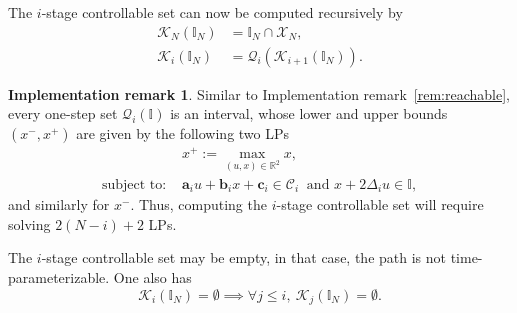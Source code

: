 \documentclass[journal]{IEEEtran}
\theoremstyle{plain}
\theoremstyle{definition}
\theoremstyle{definition}
\newtheorem{remark2}{Implementation remark}
\newenvironment{remark}
  {\renewcommand{\qedsymbol}{$\lozenge$}%
   \pushQED{\qed}\begin{remark2}}
  {\popQED\end{remark2}}
\newcommand{\cC}{\mathscr{C}}
\newcommand{\calX}{\mathcal{X}}
\newcommand{\calK}{\mathcal{K}}
\newcommand{\bbI}{\mathbb{I}}
\newcommand{\calQ}{\mathcal{Q}}
\begin{document}
The $i$-stage controllable set can now be computed recursively by
\begin{equation}
  \label{eq:ctrl-comp}
  \begin{aligned}
    \calK_N(\bbI_N) &= \bbI_N \cap \calX_N,\\
    \calK_i(\bbI_N) &= \calQ_i(\calK_{i+1}(\bbI_N)).
  \end{aligned}
\end{equation}

\begin{remark}
\label{rem:controllable}
Similar to Implementation remark~\ref{rem:reachable},
every one-step set $\calQ_i(\bbI)$ is an interval, whose lower and
upper bounds $(x^-,x^+)$ are given by the following two LPs
\[
  \begin{aligned}
&x^+ := \max_{(u,x)\in\mathbb R^2} x, \\
\textrm{subject to:~} &\mathbf{a}_i u + \mathbf{b}_i x+ \mathbf{c}_i
\in \cC_i \ \textrm{~and~}  x + 2\Delta_i u \in\bbI,
  \end{aligned}
\]
and similarly for $x^-$. Thus, computing the $i$-stage controllable
set will require solving $2 (N - i) + 2$ LPs.
\end{remark}

The $i$-stage controllable set may be empty, in that case, the path is
not time-parameterizable. One also has
\begin{equation*}
  \calK_i(\bbI_N) = \emptyset \implies \forall j \leq
  i,\ \calK_j(\bbI_N) = \emptyset.
\end{equation*}



\end{document}
